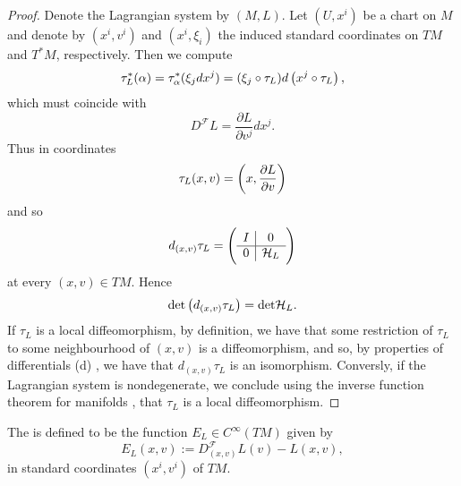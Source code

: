 \begin{proof}
	Denote the Lagrangian system by $(M,L)$. Let $(U,x^i)$ be a chart on $M$ and denote by $(x^i,v^i)$ and $(x^i,\xi_i)$ the induced standard coordinates on $TM$ and $T^*M$, respectively. Then we compute
	\begin{equation*}
		\tau^*_L(\alpha) = \tau^*_\alpha(\xi_j dx^j) = (\xi_j \circ \tau_L)d\del[1]{x^j \circ \tau_L},
	\end{equation*}
	\noindent which must coincide with
	\begin{equation*}
		D^\mathcal{F}L = \frac{\partial L}{\partial v^j}dx^j.
	\end{equation*}
	Thus in coordinates
	\begin{equation}
		\label{eq:Legendre_in_coordinates}
		\tau_L(x,v) = \del[3]{x,\frac{\partial L}{\partial v}}
	\end{equation}
	\noindent and so
	\begin{equation*}
		d_{(x,v)}\tau_L = \del{\begin{array}{c|c}
			I & 0\\\hline
			0 & \mathcal{H}_L
		\end{array}}
	\end{equation*}
	\noindent at every $(x,v) \in TM$. Hence 
	\begin{equation*}
		\det \del[1]{d_{(x,v)}\tau_L} = \det \mathcal{H}_L.
	\end{equation*}
	If $\tau_L$ is a local diffeomorphism, by definition, we have that some restriction of $\tau_L$ to some neighbourhood of $(x,v)$ is a diffeomorphism, and so, by properties of differentials (d) \cite[55]{lee:smooth_manifolds:2013}, we have that $d_{(x,v)}\tau_L$ is an isomorphism. Conversly, if the Lagrangian system is nondegenerate, we conclude using the inverse function theorem for manifolds \cite[79]{lee:smooth_manifolds:2013}, that $\tau_L$ is a local diffeomorphism.
\end{proof}

\begin{definition}[Energy]
	The  is defined to be the function $E_L \in C^\infty(TM)$ given by
	\begin{equation*}
		E_L(x,v) := D^\mathcal{F}_{(x,v)}L(v) - L(x,v),
	\end{equation*}
	\noindent in standard coordinates $(x^i,v^i)$ of $TM$.
\end{definition}

